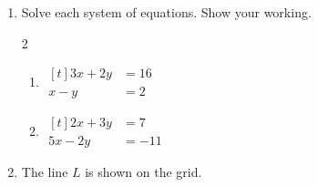 \documentclass[12pt, twoside]{article}
\begin{document}
\begin{enumerate}[itemsep=0.15cm]
\newpage

\item[3.]
Solve each system of equations. Show your working.

\begin{multicols}{2}
\begin{enumerate}[itemsep=0.1cm]
  \item $\begin{aligned}[t] 3x + 2y &= 16 \\ x - y &= 2 \end{aligned}$
  \item $\begin{aligned}[t] 2x + 3y &= 7 \\ 5x - 2y &= -11 \end{aligned}$
\end{enumerate}
\end{multicols}


\item[4.]
The line $L$ is shown on the grid.


\end{enumerate}
\end{document}
